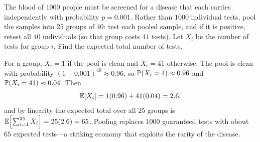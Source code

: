 \begin{example}
The blood of $1000$ people must be screened for a disease that each carries
independently with probability $p=0.001$. Rather than $1000$ individual tests,
pool the samples into $25$ groups of $40$: test each pooled sample, and if it is
positive, retest all $40$ individuals (so that group costs $41$ tests). Let
$X_i$ be the number of tests for group $i$. Find the expected total number of
tests.

\solution For a group, $X_i=1$ if the pool is clean and $X_i=41$ otherwise. The
pool is clean with probability $(1-0.001)^{40}\approx 0.96$, so
$\mathbb{P}(X_i=1)\approx 0.96$ and $\mathbb{P}(X_i=41)\approx 0.04$. Then
\[
  \mathbb{E}[X_i]=1(0.96)+41(0.04)=2.6,
\]
and by linearity the expected total over all $25$ groups is
$\mathbb{E}\!\left[\sum_{i=1}^{25}X_i\right]=25(2.6)=65$. Pooling replaces $1000$
guaranteed tests with about $65$ expected tests—a striking economy that exploits
the rarity of the disease.
\end{example}
